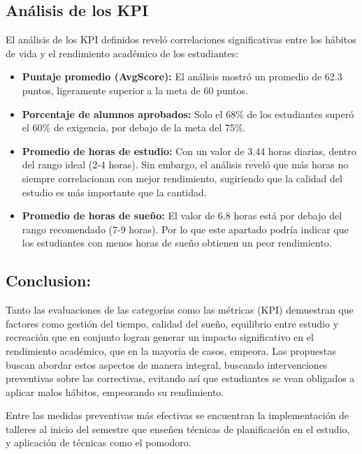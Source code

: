 \documentclass[12pt,letterpaper]{report}
\begin{document}
\subsection{Análisis de los KPI}
El análisis de los KPI definidos reveló correlaciones significativas entre los hábitos de vida y el rendimiento académico de los estudiantes:

\begin{itemize}
    \item \textbf{Puntaje promedio (AvgScore):} El análisis mostró un promedio de 62.3 puntos, ligeramente superior a la meta de 60 puntos.
    
    \item \textbf{Porcentaje de alumnos aprobados:} Solo el 68\% de los estudiantes superó el 60\% de exigencia, por debajo de la meta del 75\%.
    
    \item \textbf{Promedio de horas de estudio:} Con un valor de 3.44 horas diarias, dentro del rango ideal (2-4 horas). Sin embargo, el análisis reveló que más horas no siempre correlacionan con mejor rendimiento, sugiriendo que la calidad del estudio es más importante que la cantidad.
    
    \item \textbf{Promedio de horas de sueño:} El valor de 6.8 horas está por debajo del rango recomendado (7-9 horas).
    Por lo que este apartado podría indicar que los estudiantes con menos horas de sueño obtienen un peor rendimiento.
\end{itemize}

\subsection{Conclusion:} 
Tanto las evaluaciones de las categorías como las métricas (KPI) demuestran que factores como gestión del tiempo, calidad del sueño, equilibrio entre estudio y recreación que en conjunto logran generar un impacto significativo en el rendimiento académico, que en la mayoría de casos, empeora. Las propuestas buscan abordar estos aspectos de manera integral, buscando intervenciones preventivas sobre las correctivas, evitando así que estudiantes se vean obligados a aplicar malos hábitos, empeorando su rendimiento.

\space
Entre las medidas preventivas más efectivas se encuentran la implementación de talleres al inicio del semestre que enseñen técnicas de planificación en el estudio, y aplicación de técnicas como el pomodoro.
\end{document}
